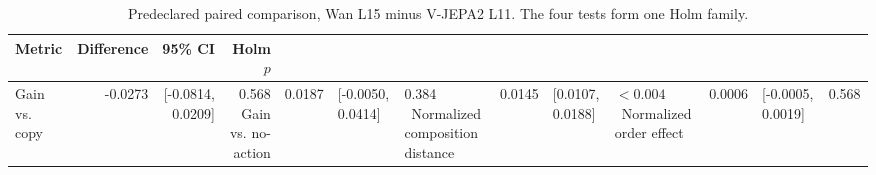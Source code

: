 \begin{table}[t]
\centering
\small
\caption{Predeclared paired comparison, Wan L15 minus V-JEPA2 L11. The four tests form one Holm family.}
\label{tab:se3_representative}
\begin{tabular}{lrrr}
\toprule
Metric & Difference & 95\% CI & Holm $p$ \\
\midrule
Gain vs. copy & -0.0273 & [-0.0814, 0.0209] & 0.568 \
Gain vs. no-action & 0.0187 & [-0.0050, 0.0414] & 0.384 \
Normalized composition distance & 0.0145 & [0.0107, 0.0188] & $<0.004$ \
Normalized order effect & 0.0006 & [-0.0005, 0.0019] & 0.568 \
\bottomrule
\end{tabular}
\end{table}
